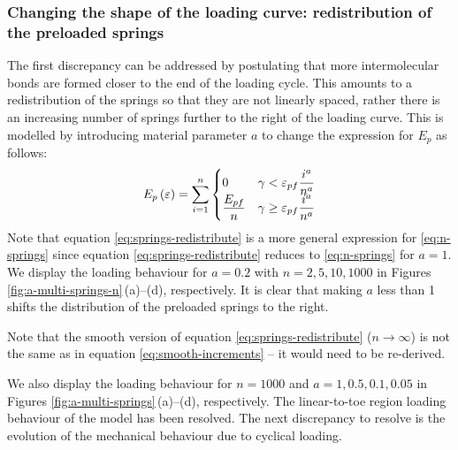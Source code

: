 \documentclass{article}
\begin{document}
\subsubsection{Changing the shape of the loading curve: redistribution of the preloaded springs}
The first discrepancy can be addressed by postulating that more intermolecular bonds are formed closer to the end of the loading cycle. This amounts to a redistribution of the springs so that they are not linearly spaced, rather there is an increasing number of springs further to the right of the loading curve. This is modelled by introducing material parameter $a$ to change the expression for $E_p$ as follows:
\begin{equation}
	E_p\left(\varepsilon\right) = \sum_{i=1}^{n}\begin{cases}
		0 & \gamma < \varepsilon_{pf}\dfrac{i^{a}}{n^{a}} \\
		\dfrac{E_{pf}}{n} & \gamma \geq \varepsilon_{pf}\dfrac{i^{a}}{n^{a}}
	\end{cases}
\label{eq:springs-redistribute}
\end{equation}
Note that equation \eqref{eq:springs-redistribute} is a more general expression for \eqref{eq:n-springs} since equation \eqref{eq:springs-redistribute} reduces to \eqref{eq:n-springs} for $a=1$. We display the loading behaviour for $a=0.2$ with $n=2,5,10,1000$ in Figures \ref{fig:a-multi-springs-n}\,(a)--(d), respectively.
It is clear that making $a$ less than 1 shifts the distribution of the preloaded springs to the right.

Note that the smooth version of equation \eqref{eq:springs-redistribute} ($n\rightarrow\infty$) is not the same as in equation \eqref{eq:smooth-increments} -- it would need to be re-derived.

We also display the loading behaviour for $n=1000$ and $a=1,0.5,0.1,0.05$ in Figures \ref{fig:a-multi-springs}\,(a)--(d), respectively.
The linear-to-toe region loading behaviour of the model has been resolved. The next discrepancy to resolve is the evolution of the mechanical behaviour due to cyclical loading.
\end{document}
